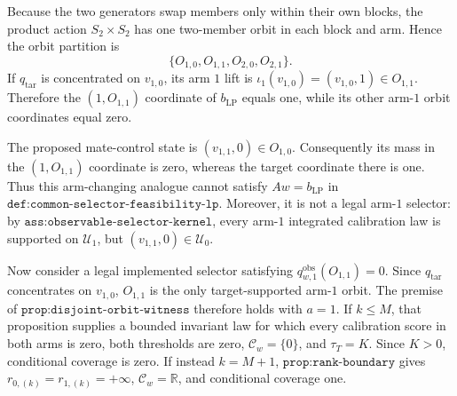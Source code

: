Because the two generators swap members only within their own blocks, the product action \(S_2\times S_2\) has one two-member orbit in each block and arm. Hence the orbit partition is \[\{O_{1,0},O_{1,1},O_{2,0},O_{2,1}\}.\] If \(q_{\mathrm{tar}}\) is concentrated on \(v_{1,0}\), its arm \(1\) lift is \(\iota_1(v_{1,0})=(v_{1,0},1)\in O_{1,1}\). Therefore the \((1,O_{1,1})\) coordinate of \(b_{\mathrm{LP}}\) equals one, while its other arm-\(1\) orbit coordinates equal zero.

The proposed mate-control state is \((v_{1,1},0)\in O_{1,0}\). Consequently its mass in the \((1,O_{1,1})\) coordinate is zero, whereas the target coordinate there is one. Thus this arm-changing analogue cannot satisfy \(Aw=b_{\mathrm{LP}}\) in \(\texttt{def:common-selector-feasibility-lp}\). Moreover, it is not a legal arm-\(1\) selector: by \(\texttt{ass:observable-selector-kernel}\), every arm-\(1\) integrated calibration law is supported on \(\mathcal U_1\), but \((v_{1,1},0)\in\mathcal U_0\).

Now consider a legal implemented selector satisfying \(q^{\mathrm{obs}}_{w,1}(O_{1,1})=0\). Since \(q_{\mathrm{tar}}\) concentrates on \(v_{1,0}\), \(O_{1,1}\) is the only target-supported arm-\(1\) orbit. The premise of \(\texttt{prop:disjoint-orbit-witness}\) therefore holds with \(a=1\). If \(k\le M\), that proposition supplies a bounded invariant law for which every calibration score in both arms is zero, both thresholds are zero, \(\mathcal C_w=\{0\}\), and \(\tau_T=K\). Since \(K>0\), conditional coverage is zero. If instead \(k=M+1\), \(\texttt{prop:rank-boundary}\) gives \(r_{0,(k)}=r_{1,(k)}=+\infty\), \(\mathcal C_w=\mathbb R\), and conditional coverage one.